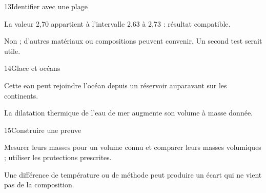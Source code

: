 \par\noindent\begin{minipage}{\linewidth}
\begin{corrige}{13}{Identifier avec une plage}
\begin{questions}
\item La valeur 2,70 appartient à l’intervalle 2,63 à 2,73 : résultat compatible.
\item Non ; d’autres matériaux ou compositions peuvent convenir. Un second test serait utile.
\end{questions}
\end{corrige}
\end{minipage}
\par\noindent\begin{minipage}{\linewidth}
\begin{corrige}{14}{Glace et océans}
\begin{questions}
\item Cette eau peut rejoindre l’océan depuis un réservoir auparavant sur les continents.
\item La dilatation thermique de l’eau de mer augmente son volume à masse donnée.
\end{questions}
\end{corrige}
\end{minipage}
\par\noindent\begin{minipage}{\linewidth}
\begin{corrige}{15}{Construire une preuve}
\begin{questions}
\item Mesurer leurs masses pour un volume connu et comparer leurs masses volumiques ; utiliser les protections prescrites.
\item Une différence de température ou de méthode peut produire un écart qui ne vient pas de la composition.
\end{questions}
\end{corrige}
\end{minipage}
